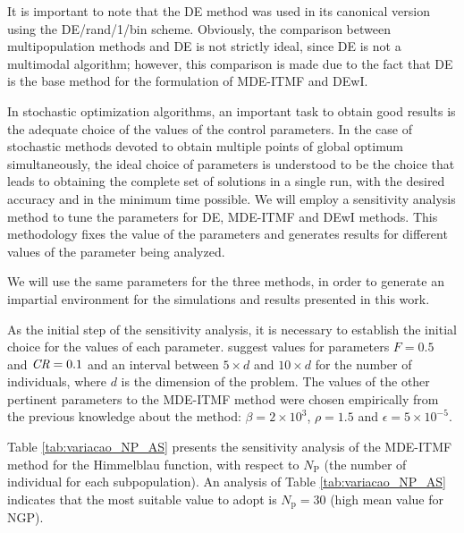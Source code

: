 \documentclass[smallextended]{svjour3}       %
\begin{document}
It is important to note that the DE method was used in its canonical version using the DE/rand/1/bin scheme. Obviously, the comparison between multipopulation methods and DE is not strictly ideal, since DE is not a multimodal algorithm; however, this comparison is made due to the fact that DE is the base method for the formulation of MDE-ITMF and DEwI.

In stochastic optimization algorithms, an important task to obtain good results is the adequate choice of the values of the control parameters. In the case of stochastic methods devoted to obtain multiple points of global optimum simultaneously, the ideal choice of parameters is understood to be the choice that leads to obtaining the complete set of solutions in a single run, with the desired accuracy and in the minimum time possible. We will employ a sensitivity analysis method to tune the parameters for DE, MDE-ITMF and DEwI methods. This methodology fixes the value of the parameters and generates results for different values of the parameter being analyzed.

We will use the same parameters for the three methods, in order to generate an impartial environment for the simulations and results presented in this work.

As the initial step of the sensitivity analysis, it is necessary to establish the initial choice for the values of each parameter. \cite{bib:storn1997differential} suggest values for parameters $F = 0.5$ and $\emph{CR} = 0.1$ and an interval between $5 \times d$ and $10 \times d$ for the number of individuals, where $d$ is the dimension of the problem. The values of the other pertinent parameters to the MDE-ITMF method were chosen empirically from the previous knowledge about the method: $ \beta = 2\times10^{3} $, $ \rho = 1.5 $ and $ \epsilon = 5 \times 10^{-5} $. 

Table \ref{tab:variacao_NP_AS} presents the sensitivity analysis of the MDE-ITMF method for the Himmelblau function, with respect to $N_\text{P}$ (the number of individual for each subpopulation). An analysis of Table \ref{tab:variacao_NP_AS} indicates that the most suitable value to adopt is $N_{\text{p}} = 30$ (high mean value for NGP). 
\end{document}
